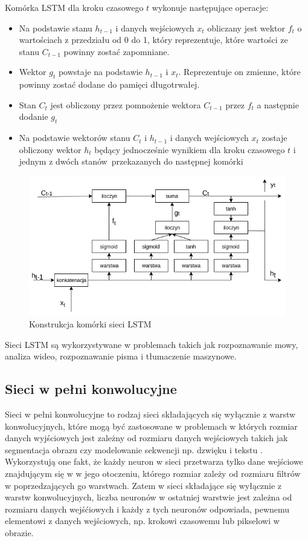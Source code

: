 \documentclass[a4paper,11pt,twoside]{report}
\theoremstyle{definition}
\begin{document}
Komórka LSTM dla kroku czasowego $t$ wykonuje następujące operacje:
\begin{itemize}
	\item Na podstawie stanu $h_{t-1}$ i danych wejściowych $x_t$ obliczany jest wektor $f_t$ o wartościach z przedziału od 0 do 1, który reprezentuje, które wartości ze stanu $C_{t-1}$ powinny zostać zapomniane. 
	\item Wektor $g_t$ powstaje na podstawie $h_{t-1}$ i $x_t$. Reprezentuje on zmienne, które powinny zostać dodane do pamięci długotrwałej.
	\item Stan $C_t$ jest obliczony przez pomnożenie wektora $C_{t-1}$ przez $f_t$ a następnie dodanie $g_t$
	\item Na podstawie wektorów stanu $C_t$ i $h_{t-1}$ i danych wejściowych $x_t$ zostaje obliczony wektor $h_t$ będący jednocześnie wynikiem dla kroku czasowego $t$ i jednym z dwóch stanów~przekazanych do następnej komórki
\end{itemize}

\begin{figure}[h!]
	\centering
	\includegraphics[scale=0.6]{lstm}
	\caption{Konstrukcja komórki sieci LSTM}
\end{figure}

Sieci LSTM są wykorzystywane w problemach takich jak rozpoznawanie mowy\cite{lstmSpeech}, analiza wideo\cite{lstmVideo}, rozpoznawanie pisma \cite{lstmHandwriting} i tłumaczenie maszynowe\cite{lstmTranslation}.

\subsection{Sieci w pełni konwolucyjne}

Sieci w pełni konwolucyjne to rodzaj sieci składających się wyłącznie z warstw konwolucyjnych, które mogą być zastosowane w problemach w których rozmiar danych wyjściowych jest zależny od rozmiaru danych wejściowych takich jak segmentacja obrazu\cite{segmentation} czy modelowanie sekwencji np. dzwięku i tekstu \cite{sequenceModelling}. Wykorzystują one fakt, że każdy neuron w sieci przetwarza tylko dane wejściowe znajdującym się w w jego otoczeniu, którego rozmiar zależy od rozmiaru filtrów w poprzedzających go warstwach. Zatem w sieci składające się wyłącznie z warstw konwolucyjnych, liczba neuronów w ostatniej warstwie jest zależna od rozmiaru danych wejśćiowych i każdy z tych neuronów odpowiada, pewnemu elementowi z danych wejściowych, np. krokowi czasowemu lub pikselowi w obrazie\cite{fcn}.
\end{document}
